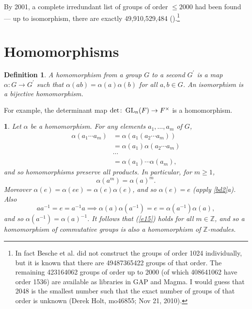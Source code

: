 \documentclass[a4paper,11pt,final]{memoir}%
\newtheorem{definition}[X]{Definition}
\newtheorem{plain}[X]{}
\theoremstyle{nonumberplain}
\begin{document}
By 2001, a complete irredundant list of groups of order $\leq2000$ had been
found --- up to isomorphism, there are exactly 49,910,529,484
(\cite{besche2001}).\footnote{In fact Besche et al. did not construct the
groups of order 1024 individually, but it is known that there are 49487365422
groups of that order. The remaining 423164062 groups of order up to 2000 (of
which 408641062 have order 1536) are available as libraries in GAP and Magma.
I would guess that 2048 is the smallest number such that the exact number of
groups of that order is unknown (Derek Holt, mo46855; Nov 21, 2010).}

\section{Homomorphisms}

\begin{definition}
\label{bd9}A \emph{homomorphism}%
%
\emph{\/} from a group $G$ to a second $G^{\prime}$ is a map $\alpha\colon
G\rightarrow G^{\prime}$ such that $\alpha(ab)=\alpha(a)\alpha(b)$ for all
$a,b\in G$. An \emph{isomorphism}%
is a bijective homomorphism.
\end{definition}

For example, the determinant map $\det\colon\operatorname{GL}_{n}(F)\rightarrow F^{\times}$
is a homomorphism.

\begin{plain}
\label{bd10}Let $\alpha$ be a homomorphism. For any elements $a_{1}%
,\ldots,a_{m}$ of $G$,%
\begin{align*}
\alpha(a_{1}\cdots a_{m})  &  =\alpha(a_{1}(a_{2}\cdots a_{m}))\\
&  =\alpha(a_{1})\alpha(a_{2}\cdots a_{m})\\
&  \cdots\\
&  =\alpha(a_{1})\cdots\alpha(a_{m})\text{,}%
\end{align*}
and so homomorphisms preserve all products. In particular, for $m\geq1$,
\begin{equation}
\alpha(a^{m})=\alpha(a)^{m}. \label{e15}%
\end{equation}
Moreover $\alpha(e)=\alpha(ee)=\alpha(e)\alpha(e)$, and so $\alpha(e)=e$
(apply \ref{bd2}a). Also
\[
aa^{-1}=e=a^{-1}a\implies\alpha(a)\alpha(a^{-1})=e=\alpha(a^{-1})\alpha(a),
\]
and so $\alpha(a^{-1})=\alpha(a)^{-1}$. It follows that (\ref{e15}) holds for
all $m\in\mathbb{Z}$, and so a homomorphism of commutative groups is also a
homomorphism of $\mathbb{Z}$-modules.
\end{plain}
\end{document}
